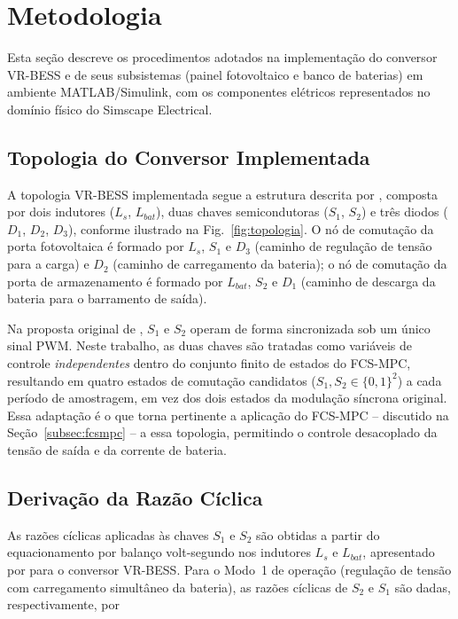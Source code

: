 \section{Metodologia}
\label{sec:metodologia}

Esta seção descreve os procedimentos adotados na implementação do conversor
VR-BESS e de seus subsistemas (painel fotovoltaico e banco de baterias) em
ambiente MATLAB/Simulink, com os componentes elétricos representados no
domínio físico do Simscape Electrical.

\subsection{Topologia do Conversor Implementada}
\label{subsec:topologia_impl}

A topologia VR-BESS implementada segue a estrutura descrita por
\cite{srinivasa2016vrbess}, composta por dois indutores ($L_s$, $L_{bat}$),
duas chaves semicondutoras ($S_1$, $S_2$) e três diodos ($D_1$, $D_2$,
$D_3$), conforme ilustrado na Fig.~\ref{fig:topologia}. O nó de comutação da
porta fotovoltaica é formado por $L_s$, $S_1$ e $D_3$ (caminho de regulação
de tensão para a carga) e $D_2$ (caminho de carregamento da bateria); o nó
de comutação da porta de armazenamento é formado por $L_{bat}$, $S_2$ e
$D_1$ (caminho de descarga da bateria para o barramento de saída).

Na proposta original de \cite{srinivasa2016vrbess}, $S_1$ e $S_2$ operam de
forma sincronizada sob um único sinal PWM. Neste trabalho, as duas chaves
são tratadas como variáveis de controle \emph{independentes} dentro do
conjunto finito de estados do FCS-MPC, resultando em quatro estados de
comutação candidatos ($S_1,S_2 \in \{0,1\}^2$) a cada período de
amostragem, em vez dos dois estados da modulação síncrona original. Essa
adaptação é o que torna pertinente a aplicação do FCS-MPC -- discutido na
Seção~\ref{subsec:fcsmpc} -- a essa topologia, permitindo o controle
desacoplado da tensão de saída e da corrente de bateria.

\subsection{Derivação da Razão Cíclica}
\label{subsec:duty_cycle}

As razões cíclicas aplicadas às chaves $S_1$ e $S_2$ são obtidas a partir
do equacionamento por balanço volt-segundo nos indutores $L_s$ e $L_{bat}$,
apresentado por \cite{kai2024projeto} para o conversor VR-BESS. Para o
Modo~1 de operação (regulação de tensão com carregamento simultâneo da
bateria), as razões cíclicas de $S_2$ e $S_1$ são dadas, respectivamente,
por

